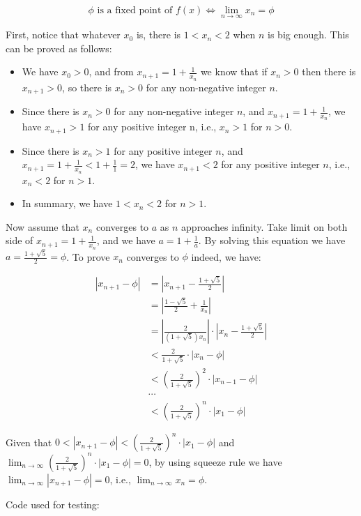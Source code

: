 \documentclass[../main.tex]{subfiles}
\begin{document}
$$
\phi\text{ is a fixed point of }f(x)\iff\lim_{n\to\infty}x_n=\phi
$$

First, notice that whatever $x_0$ is, there is
 $1<x_n<2$ when $n$ is big enough. This can be
 proved as follows:

\begin{itemize}
\item We have $x_0 > 0$, and from $x_{n+1}=1+\frac{1}{x_n}$ we
 know that if $x_n > 0$ then there is $x_{n+1} > 0$, so there is
 $x_n > 0$ for any non-negative integer $n$.
\item Since there is $x_n > 0$ for any non-negative integer $n$,
 and $x_{n+1}=1+\frac{1}{x_n}$, we have $x_{n+1} > 1$ for any
 positive integer n, i.e., $x_n > 1$ for $n > 0$.
\item Since there is $x_n > 1$ for any positive integer $n$,
 and $x_{n+1}=1+\frac{1}{x_n} < 1+\frac{1}{1} = 2$, we have
 $x_{n+1} < 2$ for any positive integer $n$, i.e., $x_n < 2$ for
 $n > 1$.
\item In summary, we have $1 < x_n < 2$ for $n > 1$.
\end{itemize}

Now assume that $x_n$ converges to $a$ as $n$ approaches infinity.
 Take limit on both side of $x_{n+1}=1+\frac{1}{x_n}$, and we have
 $a=1+\frac{1}{a}$. By solving this equation we have
 $a=\frac{1+\sqrt{5}}{2}=\phi$. To prove $x_n$ converges to $\phi$ indeed,
 we have:

\begin{align*}
|x_{n+1}-\phi| &= \left|x_{n+1}-\frac{1+\sqrt{5}}{2}\right| \\
&= \left|\frac{1-\sqrt{5}}{2}+\frac{1}{x_n}\right| \\
&= \left|\frac{2}{(1+\sqrt{5})x_n}\right|\cdot\left|x_n - \frac{1+\sqrt{5}}{2}\right| \\
&< \frac{2}{1+\sqrt{5}}\cdot|x_n - \phi| \\
&< \left(\frac{2}{1+\sqrt{5}}\right)^2\cdot|x_{n-1} - \phi| \\
&\cdots \\
&< \left(\frac{2}{1+\sqrt{5}}\right)^n\cdot|x_1 - \phi|
\end{align*}

Given that $0<|x_{n+1}-\phi|<\left(\frac{2}{1+\sqrt{5}}\right)^n\cdot|x_1 - \phi|$ and $\lim_{n\to\infty}\left(\frac{2}{1+\sqrt{5}}\right)^n\cdot|x_1 - \phi|=0$, by using squeeze rule we have $\lim_{n\to\infty}|x_{n+1}-\phi|=0$, i.e., $\lim_{n\to\infty}x_n=\phi$.

Code used for testing:
\end{document}
